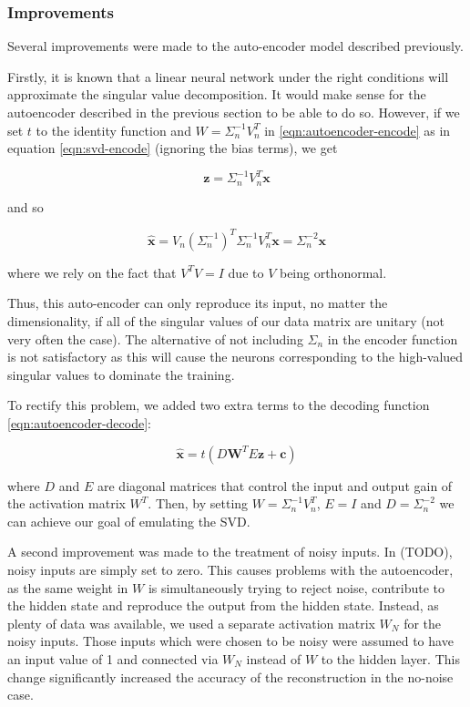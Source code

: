 \documentclass{article}
\begin{document}
\subsubsection{Improvements}

Several improvements were made to the auto-encoder model described previously.

Firstly, it is known that a linear neural network under the right conditions will approximate the singular value decomposition.  It would make sense for the autoencoder described in the previous section to be able to do so.  However, if we set $t$ to the identity function and $W = \Sigma_n^{-1} V_n^T$ in \ref{eqn:autoencoder-encode} as in equation \ref{eqn:svd-encode} (ignoring the bias terms), we get

\begin{equation}
\mathbf{z} = \Sigma_n^{-1} V_n^T \mathbf{x}
\end{equation}

and so

\begin{equation}
\hat{\mathbf{x}} = V_n \left( \Sigma_n^{-1} \right)^T \Sigma_n^{-1} V_n^T \mathbf{x} = \Sigma_n^{-2} \mathbf{x}
\end{equation}

where we rely on the fact that $V^T V = I$ due to $V$ being orthonormal.

Thus, this auto-encoder can only reproduce its input, no matter the dimensionality, if all of the singular values of our data matrix are unitary (not very often the case).  The alternative of not including $\Sigma_n$ in the encoder function is not satisfactory as this will cause the neurons corresponding to the high-valued singular values to dominate the training.

To rectify this problem, we added two extra terms to the decoding function \ref{eqn:autoencoder-decode}:

\begin{equation}
\label{eqn:autoencoder-decode}
\hat{\mathbf{x}} = t(D \mathbf{W}^T E \mathbf{z} + \mathbf{c})
\end{equation}

where $D$ and $E$ are diagonal matrices that control the input and output gain of the activation matrix $W^T$.  Then, by setting $W = \Sigma_n^{-1} V_n^T$, $E = I$ and $D = \Sigma_n^{-2}$ we can achieve our goal of emulating the SVD.

A second improvement was made to the treatment of noisy inputs.  In (TODO), noisy inputs are simply set to zero.  This causes problems with the autoencoder, as the same weight in $W$ is simultaneously trying to reject noise, contribute to the hidden state and reproduce the output from the hidden state.  Instead, as plenty of data was available, we used a separate activation matrix $W_N$ for the noisy inputs.  Those inputs which were chosen to be noisy were assumed to have an input value of 1 and connected via $W_N$ instead of $W$ to the hidden layer.  This change significantly increased the accuracy of the reconstruction in the no-noise case.
\end{document}
